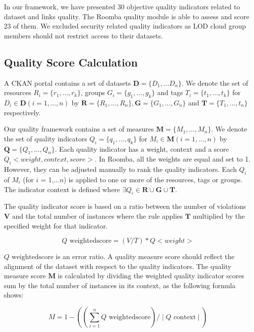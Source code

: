 In our framework, we have presented 30 objective quality indicators related to dataset and links quality. The Roomba quality module is able to assess and score 23 of them. We excluded security related quality indicators as LOD cloud group members should not restrict access to their datasets.

\subsection{Quality Score Calculation}
A CKAN portal contains a set of datasets $\textbf{D} = \{D_1,...D_n\}$. We denote the set of resources $R_i = \{r_1,...,r_k\}$, groups $G_i = \{g_1,...,g_k\}$ and tags $T_i = \{t_1,...,t_k\}$ for $D_i \in \textbf{D} (i=1,...,n)$ by $  \textbf{R}=\{R_1,...,R_n\}, \textbf{G}=\{G_1,...,G_n\}$ and $\textbf{T}=\{T_1,...,t_n\}$ respectively.

Our quality framework contains a set of measures $\textbf{M} = \{M_1,...,M_n\}$. We denote the set of quality indicators $Q_i = \{q_1,...,q_k\}$ for $M_i \in \textbf{M} (i=1,...,n)$ by $\textbf{Q} = \{Q_1,...,Q_n\}$. Each quality indicator has a weight, context and a score $Q_i<weight, context, score>$. In Roomba, all the weights are equal and set to 1. However, they can be adjusted manually to rank the quality indicators. Each $Q_i$ of $M_i$ (for $i$ = 1,...$n$) is applied to one or more of the resources, tags or groups. The indicator context is defined where $\exists Q_i \in \textbf{R} \cup \textbf{G} \cup \textbf{T}$.

The quality indicator score is based on a ratio between the number of violations $\textbf{V}$ and the total number of instances where the rule applies $\textbf{T}$ multiplied by the specified weight for that indicator.

\begin{equation}
 Q\textrm{ weightedscore} = (V/T) * Q<weight>
\end{equation}

$Q\textrm{ weightedscore}$ is an error ratio. A quality measure score should reflect the alignment of the dataset with respect to the quality indicators. The quality measure score \textbf{M} is calculated by dividing the weighted quality indicator scores sum by the total number of instances in its context, as the following formula shows:

\begin{equation}
 M =  1 - ((\sum_{i=1}^{n} Q\textrm{ weightedscore}) / \mid Q\textrm{ context} \mid )
\end{equation}


